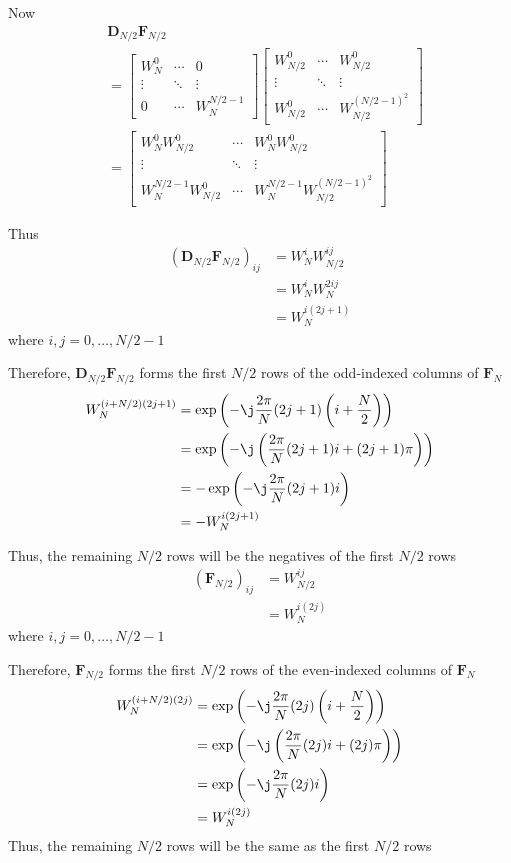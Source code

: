 \documentclass[journal,12pt,twocolumn]{IEEEtran}
\providecommand{\brak}[1]{\ensuremath{\left(#1\right)}}
\let\vec\mathbf
\numberwithin{equation}{section}
\renewcommand\thesection{\arabic{section}}
\newcommand{\mymat}[1]{\ensuremath{\begin{bmatrix}#1\end{bmatrix}}}
\begin{document}
\begin{enumerate}[label=\thesection.\arabic*]
	Now
	\begin{align}
		&\vec{D}_{N/2}\vec{F}_{N/2} \\
		&= \mymat{W_N^0 & \cdots & 0 \\ \vdots & \ddots & \vdots \\ 0 & \cdots & W_N^{N/2-1}} \mymat{W_{N/2}^0 & \cdots & W_{N/2}^0 \\ \vdots & \ddots & \vdots \\ W_{N/2}^0 & \cdots & W_{N/2}^{(N/2 - 1)^2}} \\
		&= \mymat{W_N^0 W_{N/2}^0 & \cdots & W_N^0 W_{N/2}^0 \\ \vdots & \ddots & \vdots \\ W_N^{N/2-1} W_{N/2}^0 & \cdots & W_N^{N/2-1} W_{N/2}^{(N/2 - 1)^2}} 
	\end{align}
	
	Thus
	\begin{align}
		\brak{\vec{D}_{N/2}\vec{F}_{N/2}}_{ij} &= W_N^i W_{N/2}^{ij} \\
		&= W_N^i W_N^{2ij} \\
		&= W_N^{i(2j + 1)}
	\end{align}
	where $i, j = 0, \ldots, N/2 - 1$
	
	Therefore, $\vec{D}_{N/2}\vec{F}_{N/2}$ forms the first $N/2$ rows of the odd-indexed columns of $\vec{F}_N$
	\begin{align}
		W_N^{(i + N/2)(2j + 1)} &= \exp\brak{-\j \frac{2\pi}{N} (2j + 1)\brak{i + \frac{N}{2}}} \\
		&= \exp\brak{-\j \brak{\frac{2\pi}{N} (2j + 1)i + (2j + 1)\pi}} \\
		&= -\exp\brak{-\j \frac{2\pi}{N} (2j + 1)i} \\
		&= -W_N^{i(2j + 1)}
	\end{align}
	
	Thus, the remaining $N/2$ rows will be the negatives of the first $N/2$ rows
	\begin{align}
		\brak{\vec{F}_{N/2}}_{ij} &= W_{N/2}^{ij} \\
		&= W_N^{i(2j)}
	\end{align}
	where $i, j = 0, \ldots, N/2 - 1$
	
	Therefore, $\vec{F}_{N/2}$ forms the first $N/2$ rows of the even-indexed columns of $\vec{F}_N$
	\begin{align}
		W_N^{(i + N/2)(2j)} &= \exp\brak{-\j \frac{2\pi}{N} (2j)\brak{i + \frac{N}{2}}} \\
		&= \exp\brak{-\j \brak{\frac{2\pi}{N} (2j)i + (2j)\pi}} \\
		&= \exp\brak{-\j \frac{2\pi}{N} (2j)i} \\
		&= W_N^{i(2j)}
	\end{align}
	Thus, the remaining $N/2$ rows will be the same as the first $N/2$ rows
	

\end{enumerate}
\end{document}
